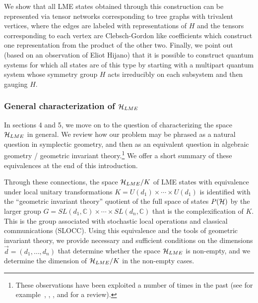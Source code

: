 \documentclass[12pt]{article}
\theoremstyle{definition}
\begin{document}
We show that all LME states obtained through this construction can be represented via tensor networks corresponding to tree graphs with trivalent vertices, where the edges are labeled with representations of $H$ and the tensors corresponding to each vertex are Clebsch-Gordon like coefficients which construct one representation from the product of the other two. Finally, we point out (based on an observation of Eliot Hijano) that it is possible to construct quantum systems for which all states are of this type by starting with a multipart quantum system whose symmetry group $H$ acts irreducibly on each subsystem and then gauging $H$.

\subsubsection{General characterization of ${\cal H}_{LME}$}

In sections 4 and 5, we move on to the question of
characterizing the space ${\cal H}_{LME}$ in general. We review how our
problem may be phrased as a natural question in symplectic
geometry, and then as an equivalent question in algebraic geometry / geometric invariant theory.\footnote{
These observations have been exploited a number of times in the past (see for example~\cite{Kly02}, \cite[\S~3]{Kly07}, \cite[\S~4]{wallach}, and \cite{Walter} for a review).} We offer a short summary of these equivalences at the end of this introduction.
 
Through these connections, the space ${\cal H}_{LME}/K$ of LME states with equivalence under local unitary transformations $K = U(d_1) \times \cdots \times U(d_1)$ is identified with the ``geometric invariant theory'' quotient of the full space of states $P({\cal H})$ by the larger group $G = SL(d_1, \mathbb{C}) \times \cdots \times SL(d_n, \mathbb{C})$ that is the complexification of $K$. This is the group associated with stochastic local operations and classical communications (SLOCC). Using this equivalence and the tools of geometric invariant theory, we provide necessary and sufficient conditions on the dimensions $\vec{d} = (d_1, \dots, d_n)$ that determine whether the space ${\cal H}_{LME}$ is non-empty, and we determine the dimension of ${\cal H}_{LME}/K$ in the non-empty cases.
\end{document}
